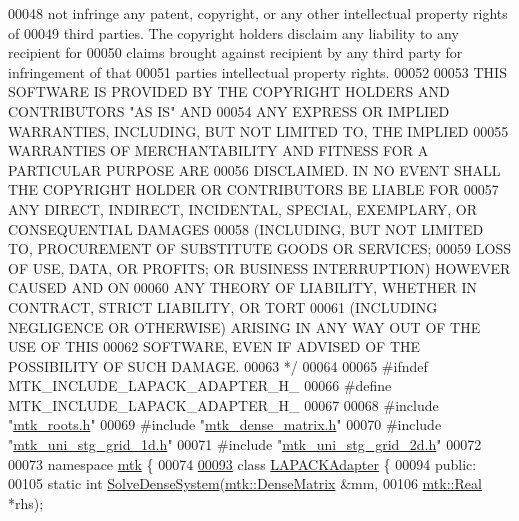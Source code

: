 \begin{DoxyCode}
00048 \textcolor{comment}{not infringe any patent, copyright, or any other intellectual property rights of}
00049 \textcolor{comment}{third parties. The copyright holders disclaim any liability to any recipient for}
00050 \textcolor{comment}{claims brought against recipient by any third party for infringement of that}
00051 \textcolor{comment}{parties intellectual property rights.}
00052 \textcolor{comment}{}
00053 \textcolor{comment}{THIS SOFTWARE IS PROVIDED BY THE COPYRIGHT HOLDERS AND CONTRIBUTORS "AS IS" AND}
00054 \textcolor{comment}{ANY EXPRESS OR IMPLIED WARRANTIES, INCLUDING, BUT NOT LIMITED TO, THE IMPLIED}
00055 \textcolor{comment}{WARRANTIES OF MERCHANTABILITY AND FITNESS FOR A PARTICULAR PURPOSE ARE}
00056 \textcolor{comment}{DISCLAIMED. IN NO EVENT SHALL THE COPYRIGHT HOLDER OR CONTRIBUTORS BE LIABLE FOR}
00057 \textcolor{comment}{ANY DIRECT, INDIRECT, INCIDENTAL, SPECIAL, EXEMPLARY, OR CONSEQUENTIAL DAMAGES}
00058 \textcolor{comment}{(INCLUDING, BUT NOT LIMITED TO, PROCUREMENT OF SUBSTITUTE GOODS OR SERVICES;}
00059 \textcolor{comment}{LOSS OF USE, DATA, OR PROFITS; OR BUSINESS INTERRUPTION) HOWEVER CAUSED AND ON}
00060 \textcolor{comment}{ANY THEORY OF LIABILITY, WHETHER IN CONTRACT, STRICT LIABILITY, OR TORT}
00061 \textcolor{comment}{(INCLUDING NEGLIGENCE OR OTHERWISE) ARISING IN ANY WAY OUT OF THE USE OF THIS}
00062 \textcolor{comment}{SOFTWARE, EVEN IF ADVISED OF THE POSSIBILITY OF SUCH DAMAGE.}
00063 \textcolor{comment}{*/}
00064 
00065 \textcolor{preprocessor}{#ifndef MTK\_INCLUDE\_LAPACK\_ADAPTER\_H\_}
00066 \textcolor{preprocessor}{#define MTK\_INCLUDE\_LAPACK\_ADAPTER\_H\_}
00067 
00068 \textcolor{preprocessor}{#include "\hyperlink{mtk__roots_8h}{mtk\_roots.h}"}
00069 \textcolor{preprocessor}{#include "\hyperlink{mtk__dense__matrix_8h}{mtk\_dense\_matrix.h}"}
00070 \textcolor{preprocessor}{#include "\hyperlink{mtk__uni__stg__grid__1d_8h}{mtk\_uni\_stg\_grid\_1d.h}"}
00071 \textcolor{preprocessor}{#include "\hyperlink{mtk__uni__stg__grid__2d_8h}{mtk\_uni\_stg\_grid\_2d.h}"}
00072 
00073 \textcolor{keyword}{namespace }\hyperlink{namespacemtk}{mtk} \{
00074 
\hypertarget{mtk__lapack__adapter_8h_source_l00093}{}\hyperlink{classmtk_1_1LAPACKAdapter}{00093} \textcolor{keyword}{class }\hyperlink{classmtk_1_1LAPACKAdapter}{LAPACKAdapter} \{
00094  \textcolor{keyword}{public}:
00105   \textcolor{keyword}{static} \textcolor{keywordtype}{int} \hyperlink{classmtk_1_1LAPACKAdapter_a7428bccf74fd4a4af68fb7233846da22}{SolveDenseSystem}(\hyperlink{classmtk_1_1DenseMatrix}{mtk::DenseMatrix} &mm,
00106                               \hyperlink{group__c01-roots_gac080bbbf5cbb5502c9f00405f894857d}{mtk::Real} *rhs);

\end{DoxyCode}
